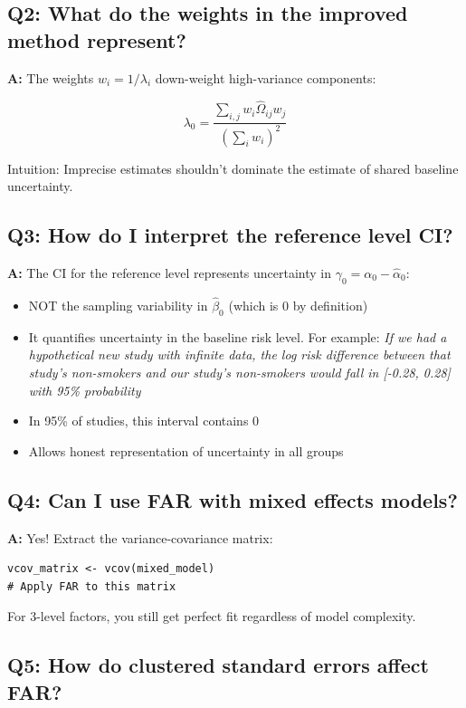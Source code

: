 \documentclass[11pt]{article}
\begin{document}
\subsection{Q2: What do the weights in the improved method represent?}

\textbf{A:} The weights $w_i = 1/\lambda_i$ down-weight high-variance components:

\begin{equation}
    \lambda_0 = \frac{\sum_{i,j} w_i \hat{\Omega}_{ij} w_j}{(\sum_i w_i)^2}
\end{equation}

Intuition: Imprecise estimates shouldn't dominate the estimate of shared baseline uncertainty.

\subsection{Q3: How do I interpret the reference level CI?}

\textbf{A:} The CI for the reference level represents uncertainty in $\gamma_0 = \alpha_0 - \hat{\alpha}_0$:
\begin{itemize}
    \item NOT the sampling variability in $\hat{\beta}_0$ (which is 0 by definition)
    \item It quantifies uncertainty in the baseline risk level. For example: \textit{If we had a hypothetical new study with infinite data, the log risk difference between that study's non-smokers and our study's non-smokers would fall in [-0.28, 0.28] with 95\% probability}
    \item In 95\% of studies, this interval contains 0
    \item Allows honest representation of uncertainty in all groups
\end{itemize}

\subsection{Q4: Can I use FAR with mixed effects models?}

\textbf{A:} Yes! Extract the variance-covariance matrix:
\begin{verbatim}
vcov_matrix <- vcov(mixed_model)
# Apply FAR to this matrix
\end{verbatim}

For 3-level factors, you still get perfect fit regardless of model complexity.

\subsection{Q5: How do clustered standard errors affect FAR?}
\end{document}
